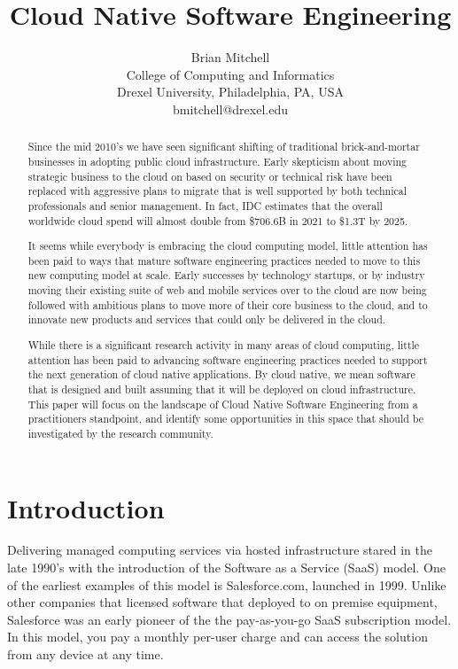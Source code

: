 \documentclass[conference]{IEEEconf}
\title{ 
        	Cloud Native Software Engineering 
      }
\author{
			Brian Mitchell\\
			College of Computing and Informatics\\
			Drexel University, Philadelphia, PA, USA\\
			bmitchell@drexel.edu
}
\date{}
\begin{document}
%

\maketitle

\thispagestyle{empty}


\begin{abstract}
Since the mid 2010's we have seen significant shifting of traditional brick-and-mortar businesses in adopting public cloud infrastructure.  Early skepticism about moving strategic business to the cloud on based on security or technical risk have been replaced with aggressive plans to migrate that is well supported by both technical professionals and senior management. In fact, IDC estimates that the overall worldwide cloud spend will almost double from \$706.6B in 2021 to \$1.3T by 2025\cite{IDCReport}.  

It seems while everybody is embracing the cloud computing model, little attention has been paid to ways that mature software engineering practices needed to move to this new computing model at scale. Early successes by technology startups, or by industry moving their existing suite of web and mobile services over to the cloud are now being followed with ambitious plans to move more of their core business to the cloud, and to innovate new products and services that could only be delivered in the cloud.

While there is a significant research activity in many areas of cloud computing, little attention has been paid to advancing software engineering practices needed to support the next generation of cloud native applications.  By cloud native, we mean software that is designed and built assuming that it will be deployed on cloud infrastructure. This paper will focus on the landscape of Cloud Native Software Engineering from a practitioners standpoint, and  identify some opportunities in this space that should be investigated by the research community.
\end{abstract}  



\section{Introduction}
\label{Intro}

Delivering managed computing services via hosted infrastructure stared in the late 1990's with the introduction of the Software as a Service (SaaS) model. One of the earliest examples of this model is Salesforce.com, launched in 1999\cite{SalesforceHistory}.  Unlike other companies that licensed software that deployed to on premise equipment, Salesforce was an early pioneer of the the pay-as-you-go SaaS subscription model. In this model, you pay a monthly per-user charge and can access the solution from any device at any time.     
\end{document}
